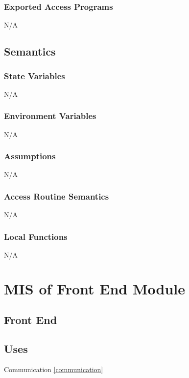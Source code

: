 \documentclass[12pt, titlepage]{article}
\begin{document}
\subsubsection{Exported Access Programs}

N/A

\subsection{Semantics}

\subsubsection{State Variables}

N/A

\subsubsection{Environment Variables}

N/A

\subsubsection{Assumptions}

N/A

\subsubsection{Access Routine Semantics}

N/A

\subsubsection{Local Functions}

N/A

\section{MIS of Front End Module} \label{fronEnd} 

\subsection{Front End}

\subsection{Uses}
Communication \ref{communication}
\end{document}
